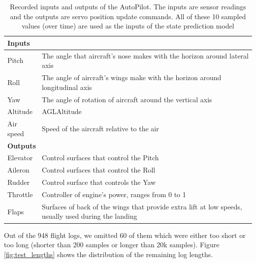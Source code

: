 \begin{table}[ht]
    \centering
    \begin{tabularx}{\columnwidth}{lX}
\toprule
\multicolumn{2}{l}{\textbf{Inputs}}                                                                              \\ \midrule
Pitch     & The angle that aircraft's nose makes with the horizon around lateral axis                            \\ 
Roll      & The angle of aircraft's wings make with the horizon around longitudinal axis                         \\ 
Yaw       & The angle of rotation of aircraft around the vertical axis                                           \\ 
Altitude  & AGL\footnotemark Altitude                                                            \\ 
Air speed & Speed of the aircraft relative to the air                                                            \\ 
\midrule
\multicolumn{2}{l}{\textbf{Outputs}}                                                                             \\ 
\midrule
Elevator  & Control surfaces that control the Pitch                                                              \\ 
Aileron   & Control surfaces that control the Roll                                                               \\ 
Rudder    & Control surface that controls the Yaw                                                                \\ 
Throttle  & Controller of engine's power, ranges from 0 to 1                                                     \\ 
Flaps     & Surfaces of back of the wings that provide extra lift at low speeds, usually used during the landing \\ \bottomrule
    \end{tabularx}
    \caption{Recorded inputs and outputs of the AutoPilot. The inputs are sensor readings and the outputs are servo position update commands. All of these 10 sampled values (over time) are used as the inputs of the state prediction model}
    \label{tab:in_outs}
\end{table}


Out of the 948 flight logs, we omitted 60 of them which were either too short or too long (shorter than 200 samples or longer than 20k samples). Figure \ref{fig:test_lengths} shows the distribution of the remaining log lengths.

